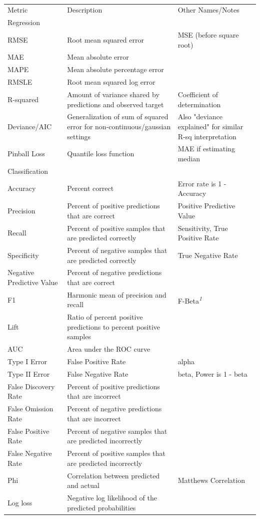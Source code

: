 \documentclass[
  letterpaper,
]{krantz}
\begin{document}
\hypertarget{tbl-performance-metrics}{}
\setlength{\LTpost}{0mm}
\begin{longtable}{lll}
\caption{\label{tbl-performance-metrics}Commonly used performance metrics in machine learning. }\tabularnewline

\caption*{
{\large }
} \\ 
\toprule
Metric & Description & Other Names/Notes \\ 
\midrule
\multicolumn{3}{l}{Regression} \\ 
\midrule
RMSE & Root mean squared error & MSE (before square root) \\ 
MAE & Mean absolute error &  \\ 
MAPE & Mean absolute percentage error &  \\ 
RMSLE & Root mean squared log error &  \\ 
R-squared & Amount of variance shared by predictions and observed target & Coefficient of determination \\ 
Deviance/AIC & Generalization of sum of squared error for non-continuous/gaussian settings & Also "deviance explained" for similar R-sq interpretation \\ 
Pinball Loss & Quantile loss function & MAE if estimating median \\ 
\midrule
\multicolumn{3}{l}{Classification} \\ 
\midrule
Accuracy & Percent correct & Error rate is 1 - Accuracy \\ 
Precision & Percent of positive predictions that are correct & Positive Predictive Value \\ 
Recall & Percent of positive samples that are predicted correctly & Sensitivity, True Positive Rate \\ 
Specificity & Percent of negative samples that are predicted correctly & True Negative Rate \\ 
Negative Predictive Value & Percent of negative predictions that are correct &  \\ 
F1 & Harmonic mean of precision and recall & F-Beta\textsuperscript{\textit{1}} \\ 
Lift & Ratio of percent positive predictions to percent positive samples &  \\ 
AUC & Area under the ROC curve &  \\ 
Type I Error & False Positive Rate & alpha \\ 
Type II Error & False Negative Rate & beta, Power is 1 - beta \\ 
False Discovery Rate & Percent of positive predictions that are incorrect &  \\ 
False Omission Rate & Percent of negative predictions that are incorrect &  \\ 
False Positive Rate & Percent of negative samples that are predicted incorrectly &  \\ 
False Negative Rate & Percent of positive samples that are predicted incorrectly &  \\ 
Phi & Correlation between predicted and actual & Matthews Correlation \\ 
Log loss & Negative log likelihood of the predicted probabilities &  \\ 
\bottomrule
\end{longtable}
\end{document}
